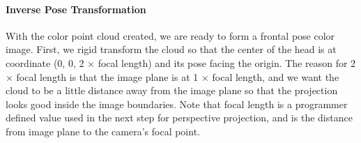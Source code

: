 \documentclass{ut-thesis}
\begin{document}
\paragraph{Inverse Pose Transformation}
With the color point cloud created, we are ready to form a frontal pose color image.  First, we rigid transform the cloud so that the center of the head is at coordinate (0, 0, 2 \( \times\) focal length) and its pose facing the origin.  The reason for 2 \( \times\) focal length is that the image plane is at 1 \( \times\) focal length, and we want the cloud to be a little distance away from the image plane so that the projection looks good inside the image boundaries.  Note that focal length is a programmer defined value used in the next step for perspective projection, and is the distance from image plane to the camera's focal point.
\end{document}
